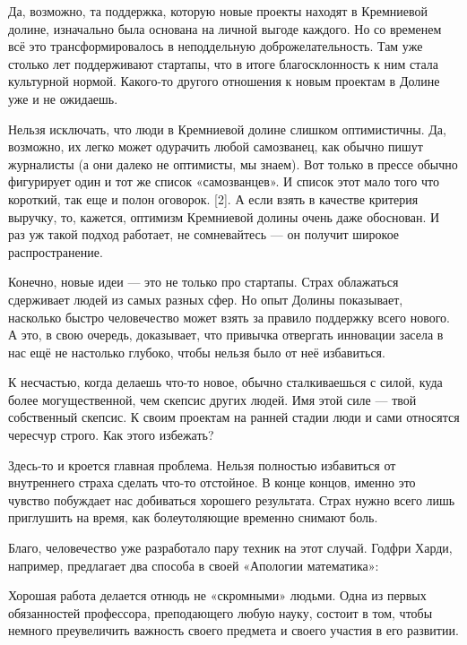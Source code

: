 \documentclass[ebook,12pt,oneside,openany]{memoir}
\begin{document}
Да, возможно, та поддержка, которую новые проекты находят в Кремниевой
долине, изначально была основана на личной выгоде каждого. Но со
временем всё это трансформировалось в неподдельную доброжелательность.
Там уже столько лет поддерживают стартапы, что в итоге благосклонность
к ним стала культурной нормой. Какого-то другого отношения к новым
проектам в Долине уже и не ожидаешь. \newline

Нельзя исключать, что люди в Кремниевой долине слишком оптимистичны.
Да, возможно, их легко может одурачить любой самозванец, как обычно
пишут журналисты (а они далеко не оптимисты, мы знаем). Вот только в
прессе обычно фигурирует один и тот же список «самозванцев». И список
этот мало того что короткий, так еще и полон оговорок. [2]. А если
взять в качестве критерия выручку, то, кажется, оптимизм Кремниевой
долины очень даже обоснован. И раз уж такой подход работает, не
сомневайтесь — он получит широкое распространение. \newline

Конечно, новые идеи — это не только про стартапы. Страх облажаться
сдерживает людей из самых разных сфер. Но опыт Долины показывает,
насколько быстро человечество может взять за правило поддержку всего
нового. А это, в свою очередь, доказывает, что привычка отвергать
инновации засела в нас ещё не настолько глубоко, чтобы нельзя было от
неё избавиться. \newline


К несчастью, когда делаешь что-то новое, обычно сталкиваешься с силой,
куда более могущественной, чем скепсис других людей. Имя этой силе —
твой собственный скепсис. К своим проектам на ранней стадии люди и
сами относятся чересчур строго. Как этого избежать? \newline

Здесь-то и кроется главная проблема. Нельзя полностью избавиться от
внутреннего страха сделать что-то отстойное. В конце концов, именно
это чувство побуждает нас добиваться хорошего результата. Страх нужно
всего лишь приглушить на время, как болеутоляющие временно снимают
боль. \newline

Благо, человечество уже разработало пару техник на этот случай. Годфри
Харди, например, предлагает два способа в своей «Апологии математика»: 

\begin{displayquote}
Хорошая работа делается отнюдь не «скромными» людьми. Одна из первых
обязанностей профессора, преподающего любую науку, состоит в том,
чтобы немного преувеличить важность своего предмета и своего участия в
его развитии.
\end{displayquote}
\end{document}
